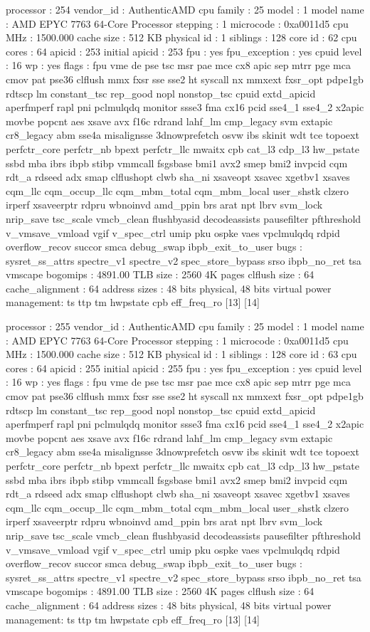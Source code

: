 processor	: 254
vendor_id	: AuthenticAMD
cpu family	: 25
model		: 1
model name	: AMD EPYC 7763 64-Core Processor
stepping	: 1
microcode	: 0xa0011d5
cpu MHz		: 1500.000
cache size	: 512 KB
physical id	: 1
siblings	: 128
core id		: 62
cpu cores	: 64
apicid		: 253
initial apicid	: 253
fpu		: yes
fpu_exception	: yes
cpuid level	: 16
wp		: yes
flags		: fpu vme de pse tsc msr pae mce cx8 apic sep mtrr pge mca cmov pat pse36 clflush mmx fxsr sse sse2 ht syscall nx mmxext fxsr_opt pdpe1gb rdtscp lm constant_tsc rep_good nopl nonstop_tsc cpuid extd_apicid aperfmperf rapl pni pclmulqdq monitor ssse3 fma cx16 pcid sse4_1 sse4_2 x2apic movbe popcnt aes xsave avx f16c rdrand lahf_lm cmp_legacy svm extapic cr8_legacy abm sse4a misalignsse 3dnowprefetch osvw ibs skinit wdt tce topoext perfctr_core perfctr_nb bpext perfctr_llc mwaitx cpb cat_l3 cdp_l3 hw_pstate ssbd mba ibrs ibpb stibp vmmcall fsgsbase bmi1 avx2 smep bmi2 invpcid cqm rdt_a rdseed adx smap clflushopt clwb sha_ni xsaveopt xsavec xgetbv1 xsaves cqm_llc cqm_occup_llc cqm_mbm_total cqm_mbm_local user_shstk clzero irperf xsaveerptr rdpru wbnoinvd amd_ppin brs arat npt lbrv svm_lock nrip_save tsc_scale vmcb_clean flushbyasid decodeassists pausefilter pfthreshold v_vmsave_vmload vgif v_spec_ctrl umip pku ospke vaes vpclmulqdq rdpid overflow_recov succor smca debug_swap ibpb_exit_to_user
bugs		: sysret_ss_attrs spectre_v1 spectre_v2 spec_store_bypass srso ibpb_no_ret tsa vmscape
bogomips	: 4891.00
TLB size	: 2560 4K pages
clflush size	: 64
cache_alignment	: 64
address sizes	: 48 bits physical, 48 bits virtual
power management: ts ttp tm hwpstate cpb eff_freq_ro [13] [14]

processor	: 255
vendor_id	: AuthenticAMD
cpu family	: 25
model		: 1
model name	: AMD EPYC 7763 64-Core Processor
stepping	: 1
microcode	: 0xa0011d5
cpu MHz		: 1500.000
cache size	: 512 KB
physical id	: 1
siblings	: 128
core id		: 63
cpu cores	: 64
apicid		: 255
initial apicid	: 255
fpu		: yes
fpu_exception	: yes
cpuid level	: 16
wp		: yes
flags		: fpu vme de pse tsc msr pae mce cx8 apic sep mtrr pge mca cmov pat pse36 clflush mmx fxsr sse sse2 ht syscall nx mmxext fxsr_opt pdpe1gb rdtscp lm constant_tsc rep_good nopl nonstop_tsc cpuid extd_apicid aperfmperf rapl pni pclmulqdq monitor ssse3 fma cx16 pcid sse4_1 sse4_2 x2apic movbe popcnt aes xsave avx f16c rdrand lahf_lm cmp_legacy svm extapic cr8_legacy abm sse4a misalignsse 3dnowprefetch osvw ibs skinit wdt tce topoext perfctr_core perfctr_nb bpext perfctr_llc mwaitx cpb cat_l3 cdp_l3 hw_pstate ssbd mba ibrs ibpb stibp vmmcall fsgsbase bmi1 avx2 smep bmi2 invpcid cqm rdt_a rdseed adx smap clflushopt clwb sha_ni xsaveopt xsavec xgetbv1 xsaves cqm_llc cqm_occup_llc cqm_mbm_total cqm_mbm_local user_shstk clzero irperf xsaveerptr rdpru wbnoinvd amd_ppin brs arat npt lbrv svm_lock nrip_save tsc_scale vmcb_clean flushbyasid decodeassists pausefilter pfthreshold v_vmsave_vmload vgif v_spec_ctrl umip pku ospke vaes vpclmulqdq rdpid overflow_recov succor smca debug_swap ibpb_exit_to_user
bugs		: sysret_ss_attrs spectre_v1 spectre_v2 spec_store_bypass srso ibpb_no_ret tsa vmscape
bogomips	: 4891.00
TLB size	: 2560 4K pages
clflush size	: 64
cache_alignment	: 64
address sizes	: 48 bits physical, 48 bits virtual
power management: ts ttp tm hwpstate cpb eff_freq_ro [13] [14]

